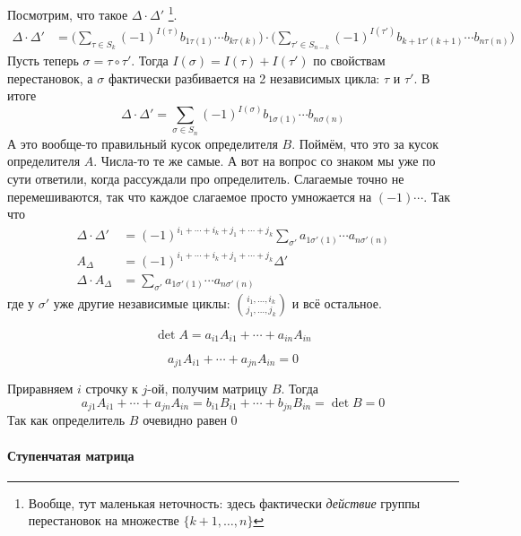 \documentclass[12pt]{../../../notes}
\begin{document}
\begin{ittproof}
  Посмотрим, что такое  $\Delta\cdot \Delta'$
  \footnote{Вообще, тут маленькая неточность: здесь фактически 
      \emph{действие} группы перестановок на множестве $\{k+1, \dotsc , n\}$}.
  \begin{align*}
    \Delta \cdot \Delta' 
    &= \Bigg( \sum_{\tau \in S_k} (-1)^{I(\tau)} b_{1\tau(1)} \dotsm
    b_{k\tau(k)} \Bigg) \cdot \Bigg( \sum_{\tau' \in S_{n-k}} (-1)^{I(\tau')} b_{k+1\tau'(k+1)} \dotsm
    b_{n\tau(n)} \Bigg)
  \end{align*}
  Пусть теперь $\sigma = \tau \circ \tau'$. Тогда $I(\sigma) = I(\tau)+I(\tau')$ по свойствам
  перестановок, а $\sigma$ фактически разбивается на 2 независимых цикла: $\tau$ и $\tau'$.
  В итоге
  \[
    \Delta \cdot \Delta' 
    = \sum_{\sigma\in S_n} (-1)^{I(\sigma)} b_{1\sigma(1)} \dotsm b_{n\sigma(n)}
  \]
  А это вообще-то правильный кусок определителя $B$. 
  Поймём, что это за кусок определителя $A$.
  Числа-то те же самые. А вот на вопрос со знаком мы уже по сути ответили, когда рассуждали про 
  определитель. Слагаемые точно не перемешиваются, так что каждое слагаемое просто умножается на
  $(-1){\cdots}$. 
  Так что 
  \begin{align*}
    \Delta \cdot \Delta' &= (-1)^{i_1  + \dotsb + i_k  + j_1  + \dotsb + j_k } 
    \sum_{\sigma'} a_{1\sigma'(1)} \dotsm a_{n\sigma'(n)} \\
    A_{\Delta} &= (-1)^{i_1  + \dotsb + i_k  + j_1  + \dotsb + j_k } \Delta'  \\
    \Delta \cdot A_{\Delta} &= \sum_{\sigma'} a_{1\sigma'(1)} \dotsm a_{n\sigma'(n)}
  \end{align*}
  где у $\sigma'$ уже другие независимые циклы: ${i_1, \dotsc , i_k\choose j_1, \dotsc , j_k }$ 
  и всё остальное.

\end{ittproof}
\begin{imp}
  \[
    \det A = a_{i1} A_{i1} + \dotsb + a_{in} A_{in} 
  \]
\end{imp}
\begin{imp}
  \[
    a_{j1} A_{i1} + \dotsb + a_{jn} A_{in} = 0
  \]
\end{imp}
\begin{itlproof}
  Приравняем $i$ строчку к $j$-ой, получим матрицу $B$. Тогда
  \[
    a_{j1} A_{i1} + \dotsb + a_{jn} A_{in} = b_{i1} B_{i1} + \dotsb + b_{jn} B_{in} = \det B = 0
  \]
  Так как определитель $B$ очевидно равен 0
\end{itlproof}

\paragraph{Ступенчатая матрица}
\end{document}
